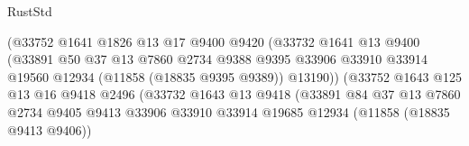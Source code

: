 \begin{lexlean}{RustStd}
\begin{coremodule}
                                        (@33752
                                          @1641
                                          @1826
                                          @13
                                          @17
                                          @9400
                                          @9420
                                          (@33732
                                            @1641
                                            @13
                                            @9400
                                            (@33891
                                              @50
                                              @37
                                              @13
                                              @7860
                                              @2734
                                              @9388
                                              @9395
                                              @33906
                                              @33910
                                              @33914
                                              @19560
                                              @12934
                                              (@11858 (@18835 @9395 @9389))
                                              @13190))
                                          (@33752
                                            @1643
                                            @125
                                            @13
                                            @16
                                            @9418
                                            @2496
                                            (@33732
                                              @1643
                                              @13
                                              @9418
                                              (@33891
                                                @84
                                                @37
                                                @13
                                                @7860
                                                @2734
                                                @9405
                                                @9413
                                                @33906
                                                @33910
                                                @33914
                                                @19685
                                                @12934
                                                (@11858 (@18835 @9413 @9406))

\end{coremodule}
\end{lexlean}
